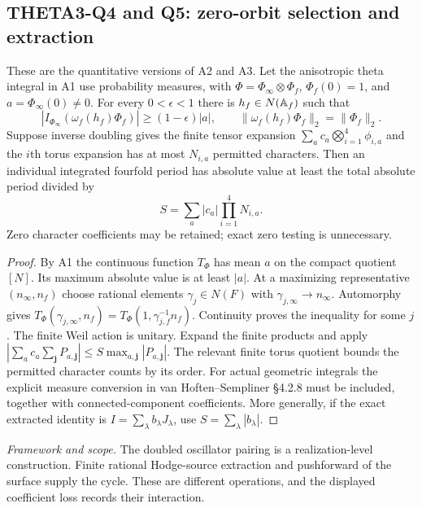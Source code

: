 \documentclass[11pt]{article}
\newcommand{\framework}[1]{\par\smallskip\noindent\textit{Framework and scope.} #1\par}
\theoremstyle{definition}\newtheorem{definition}[theorem]{Definition}\newtheorem{remark}[theorem]{Remark}
\begin{document}
\subsection{THETA3-Q4 and Q5: zero-orbit selection and extraction}\label{Q4}\label{Q5}
These are the quantitative versions of A2 and A3. Let the anisotropic theta integral in A1 use probability measures, with
$\Phi=\Phi_\infty\otimes\Phi_f$, $\Phi_f(0)=1$, and
$a=\Phi_\infty(0)\ne0$. For every $0<\epsilon<1$ there is
$h_f\in N(\mathbb A_f)$ such that
\begin{equation}\label{eq:finite-selection}
 |I_{\Phi_\infty}(\omega_f(h_f)\Phi_f)|\geq(1-\epsilon)|a|,
 \qquad\|\omega_f(h_f)\Phi_f\|_2=\|\Phi_f\|_2.
\end{equation}
Suppose inverse doubling gives the finite tensor expansion
$\sum_a c_a\bigotimes_{i=1}^4\phi_{i,a}$ and the $i$th torus expansion has at most $N_{i,a}$ permitted characters. Then an individual integrated fourfold period has absolute value at least the total absolute period divided by
\begin{equation}\label{eq:loss}
 S=\sum_a |c_a|\prod_{i=1}^4N_{i,a}.
\end{equation}
Zero character coefficients may be retained; exact zero testing is unnecessary.
\begin{proof}
By A1 the continuous function $T_\Phi$ has mean $a$ on the compact quotient $[N]$. Its maximum absolute value is at least $|a|$. At a maximizing representative $(n_\infty,n_f)$ choose rational elements $\gamma_j\in N(F)$ with $\gamma_{j,\infty}\to n_\infty$. Automorphy gives
$T_\Phi(\gamma_{j,\infty},n_f)=T_\Phi(1,\gamma_{j,f}^{-1}n_f)$.
Continuity proves the inequality for some $j$. The finite Weil action is unitary. Expand the finite products and apply
$|\sum_a c_a\sum_{\mathbf j}P_{a,\mathbf j}|
\leq S\max_{a,\mathbf j}|P_{a,\mathbf j}|$.
The relevant finite torus quotient bounds the permitted character counts by its order. For actual geometric integrals the explicit measure conversion in van Hoften--Sempliner \S4.2.8 must be included, together with connected-component coefficients. More generally, if the exact extracted identity is $I=\sum_\lambda b_\lambda J_\lambda$, use $S=\sum_\lambda|b_\lambda|$.
\end{proof}
\framework{The doubled oscillator pairing is a realization-level construction. Finite rational Hodge-source extraction and pushforward of the surface supply the cycle. These are different operations, and the displayed coefficient loss records their interaction.}
\end{document}
